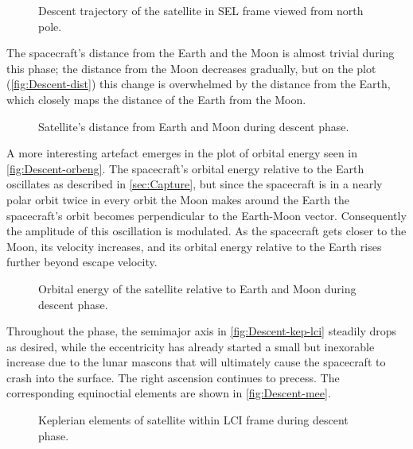 \begin{figure}
\centering
\def\svgwidth{\figurewidth}

\caption{Descent trajectory of the satellite in SEL frame viewed from north pole.} \label{fig:Descent-3D-sel}
\end{figure}

The spacecraft's distance from the Earth and the Moon is almost trivial during this phase; the distance from the Moon decreases gradually, but on the plot (\autoref{fig:Descent-dist}) this change is overwhelmed by the distance from the Earth, which closely maps the distance of the Earth from the Moon.

\begin{figure}
\centering
\def\svgwidth{\figurewidth}

\caption{Satellite's distance from Earth and Moon during descent phase.} \label{fig:Descent-dist}
\end{figure}

A more interesting artefact emerges in the plot of orbital energy seen in \autoref{fig:Descent-orbeng}. The spacecraft's orbital energy relative to the Earth oscillates as described in \autoref{sec:Capture}, but since the spacecraft is in a nearly polar orbit twice in every orbit the Moon makes around the Earth the spacecraft's orbit becomes perpendicular to the Earth-Moon vector. Consequently the amplitude of this oscillation is modulated. As the spacecraft gets closer to the Moon, its velocity increases, and its orbital energy relative to the Earth rises further beyond escape velocity.

\begin{figure}
\centering
\def\svgwidth{\figurewidth}

\caption{Orbital energy of the satellite relative to Earth and Moon during descent phase.} \label{fig:Descent-orbeng}
\end{figure}

Throughout the phase, the semimajor axis in \autoref{fig:Descent-kep-lci} steadily drops as desired, while the eccentricity has already started a small but inexorable increase due to the lunar mascons that will ultimately cause the spacecraft to crash into the surface. The right ascension continues to precess. The corresponding equinoctial elements are shown in \autoref{fig:Descent-mee}.

\begin{figure}
\centering
\def\svgwidth{\figurewidth}

\caption{Keplerian elements of satellite within LCI frame during descent phase.} \label{fig:Descent-kep-lci}
\end{figure}

